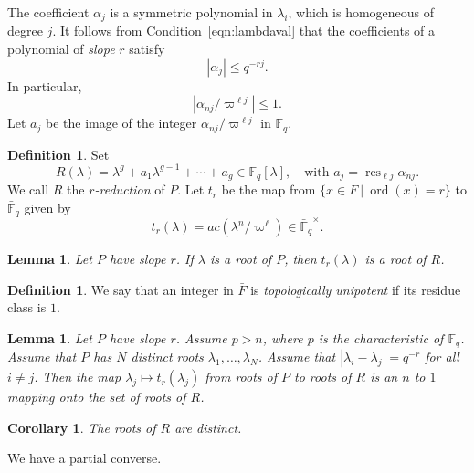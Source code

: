 \documentclass[11pt]{amsart}
\newtheorem{corollary}[theorem]{Corollary}
\newtheorem{lemma}[theorem]{Lemma}
\theoremstyle{definition}
\newtheorem{definition}[theorem]{Definition}
\theoremstyle{remark}
\numberwithin{equation}{theorem}
\def\barf{{\bar{\mathbb{F}}_q}}
\def\tq{{\ \vert\ }}
\def\Fq{{\mathbb F}_q}
\def\op#1{\operatorname{#1}}
\begin{document}
The coefficient $\alpha_{j}$ is a symmetric polynomial in
$\lambda_i$, which is homogeneous of degree $j$.  It follows from
Condition~\ref{eqn:lambdaval} that the coefficients of a
polynomial of {\it slope} $r$ satisfy
    \begin{equation}|\alpha_j|\le q^{-r j}.\end{equation}
In particular,
    \begin{equation}
    |\alpha_{n j}/\varpi^{\ell j}|\le 1.
    \end{equation}
Let $a_j$ be the image of the integer $\alpha_{n j}/\varpi^{\ell
j}$ in $\Fq$.

\begin{definition}
Set
   \begin{equation}
   R(\lambda) = \lambda^g + a_1 \lambda^{g-1}+\cdots+ a_g \in
   \Fq[\lambda],\quad
   \text{with } a_j = \op{res}_{\ell j} \alpha_{n j}.
   \label{eqn:r-reduct}
   \end{equation}
We call $R$ the {\it $r$-reduction\/} of $P$.  Let $t_r$ be the
map from $\{x\in \bar F \tq \op{ord}(x)=r\}$ to $\barf$ given by
   \begin{equation}
   t_r(\lambda) = ac (\lambda^n/\varpi^{\ell}) \in \barf^\times.
   \end{equation}
\end{definition}

\begin{lemma}
Let $P$ have slope $r$. If $\lambda$ is a root of $P$, then
    $t_r(\lambda)$ is a root of $R$.
\end{lemma}


\begin{definition}
We say that an integer in $\bar F$ is {\it topologically
unipotent\/} if its residue class is $1$.
\end{definition}

\begin{lemma}  Let $P$ have slope $r$.
Assume $p>n$, where $p$ is the characteristic  of $\Fq$. Assume
that $P$ has $N$ distinct roots $\lambda_1,\ldots,\lambda_N$.
Assume that $|\lambda_i-\lambda_j|=q^{-r}$ for all $i\ne j$. Then
the map $\lambda_j\mapsto t_r(\lambda_j)$ from roots of $P$ to
roots of $R$ is an $n$ to $1$ mapping onto the set of roots of
$R$.
\end{lemma}

\begin{corollary} The roots of $R$ are distinct.
\end{corollary}

We have a partial converse.
\end{document}
